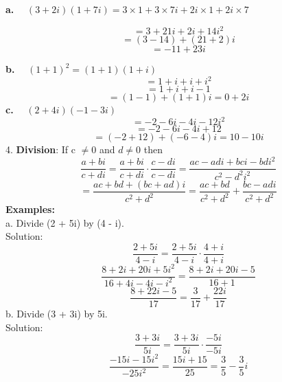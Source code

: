 \documentclass[a4paper, 12pt]{report}
\begin{document}
{\textbf{a.} $\quad (3 + 2i)(1 + 7i) = 3 \times 1 + 3 \times 7i + 2i \times 1 + 2i \times 7$

\begin{equation*}
= 3 + 21i + 2i + 14i^2
\end{equation*}
\begin{equation*}
= (3 - 14) + (21 + 2)i
\end{equation*}
\begin{equation*}
= -11 + 23i
\end{equation*}

\textbf{b.} $\quad (1 + 1)^2 = (1 + 1)(1 + i)$
\begin{equation*}
= 1 + i + i + i^2
\end{equation*}
\begin{equation*}
= 1 + i + i - 1
\end{equation*}
\begin{equation*}
= (1 - 1) + (1 + 1)i = 0 + 2i
\end{equation*}
\textbf{c.} $\quad (2 + 4i)(-1 - 3i)$
\begin{equation*}
= - 2 - 6i - 4i - 12i^2
\end{equation*}
\begin{equation*}
= - 2 - 6i - 4i + 12
\end{equation*}
\begin{equation*}
= (-2 + 12) + (-6 - 4)i = 10 - 10i
\end{equation*}
4. \textbf{Division}: If c $\neq 0$ and $d \neq 0$ then
\begin{equation*}
\frac{a + bi}{c + di} = \frac{a + bi}{c + di} \cdot \frac{c - di}{c - di} = \frac{ac - adi + bci - bdi^2}{c^2 - d^2i^2}
\end{equation*}
\begin{equation*}
= \frac{ac + bd + (bc + ad)i}{c^2 + d^2} = \frac{ac + bd}{c^2 + d^2} + \frac{bc - adi}{c^2 + d^2}
\end{equation*}
\textbf{Examples:}\\
a. Divide (2 + 5i) by (4 - i).\\
Solution:
\begin{equation*}
\frac{2 + 5i}{4 - i} = \frac{2 + 5i}{4 - i} \cdot \frac{4 + i}{4 + i}
\end{equation*}
\begin{equation*}
\frac{8 + 2i + 20i + 5i^2}{16 + 4i - 4i - i^2} = \frac{8 + 2i + 20i - 5}{16 + 1}
\end{equation*}
\begin{equation*}
\frac{8 + 22i - 5}{17} = \frac{3}{17} + \frac{22i}{17}
\end{equation*}
b. Divide (3 + 3i) by 5i.\\
Solution:
\begin{equation*}
\frac{3 + 3i}{5i} = \frac{3 + 3i}{5i} \cdot \frac{-5i}{-5i}
\end{equation*}
\begin{equation*}
\frac{- 15i - 15i^2}{-25i^2} = \frac{15i + 15}{25} = \frac{3}{5} - \frac{3}{5}i
\end{equation*}
}
\end{document}
